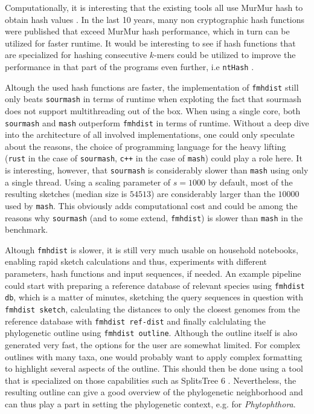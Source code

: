 Computationally, it is interesting that the existing tools all use MurMur hash
to obtain hash values
\cite{ondovMashFastGenome2016,bagciMicrobialPhylogeneticContext2021,irberLightweightCompositionalAnalysis2022}.
In the last 10 years, many non cryptographic hash functions were published that
exceed MurMur hash performance, which in turn can be utilized for faster
runtime. It would be interesting to see if hash functions that are specialized
for hashing consecutive $k$-mers could be utilized to improve the performance in
that part of the programs even further, i.e \texttt{ntHash}
\cite{mohamadiNtHashRecursiveNucleotide2016}.

Altough the used hash functions are faster, the implementation of
\texttt{fmhdist} still only beats \texttt{sourmash} in terms of runtime when
exploting the fact that sourmash does not support multithreading out of the box.
When using a single core, both \texttt{sourmash} and \texttt{mash} outperform
\texttt{fmhdist} in terms of runtime. Without a deep dive into the architecture
of all involved implementations, one could only speculate about the reasons, the
choice of programming language for the heavy lifting (\texttt{rust} in the case
of \texttt{sourmash}, \texttt{c++} in the case of \texttt{mash}) could play a
role here. It is interesting, however, that \texttt{sourmash} is considerably
slower than \texttt{mash} using only a single thread. Using a scaling parameter
of $s=1000$ by default, most of the resulting sketches (median size is $54513$)
are considerably larger than the $10000$ used by \texttt{mash}. This obviously
adds computational cost and could be among the reasons why \texttt{sourmash}
(and to some extend, \texttt{fmhdist}) is slower than \texttt{mash} in the
benchmark.

Altough \texttt{fmhdist} is slower, it is still very much usable on household
notebooks, enabling rapid sketch calculations and thus, experiments with
different parameters, hash functions and input sequences, if needed. An example
pipeline could start with preparing a reference database of relevant species
using \texttt{fmhdist db}, which is a matter of minutes, sketching the query
sequences in question with \texttt{fmhdist sketch}, calculating the distances to
only the closest genomes from the reference database with \texttt{fmhdist
ref-dist} and finally calclulating the phylogenetic outline using
\texttt{fmhdist outline}. Although the outline itself is also generated very
fast, the options for the user are somewhat limited. For complex outlines with
many taxa, one would probably want to apply complex formatting to highlight
several aspects of the outline. This should then be done using a tool that is
specialized on those capabilities such as SplitsTree 6
\cite{husonApplicationPhylogeneticNetworks2006}. Nevertheless, the resulting
outline can give a good overview of the phylogenetic neighborhood and can thus
play a part in setting the phylogenetic context, e.g. for \textit{Phytophthora}.
